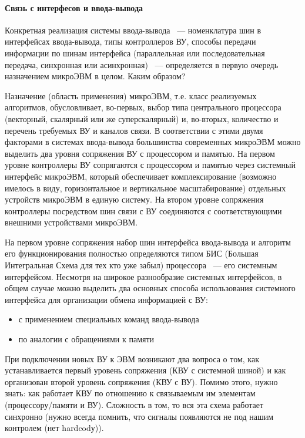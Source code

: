 \documentclass[10pt]{article}
\begin{document}
	\paragraph{Связь с интерфесов и ввода-вывода}
	Конкретная реализация системы ввода-вывода ~--- номенклатура шин в интерфейсах ввода-вывода, типы контроллеров ВУ, способы передачи информации по шинам интерфейса (параллельная или последовательная передача, синхронная или асинхронная) ~--- определяется в первую очередь назначением микроЭВМ в целом. Каким образом?

	Назначение (область применения) микроЭВМ, т.е. класс реализуемых алгоритмов, обусловливает, во-первых, выбор типа центрального процессора (векторный, скалярный или же суперскалярный) и, во-вторых, количество и перечень требуемых ВУ и каналов связи. В соответствии с этими двумя факторами в системах ввода-вывода большинства современных микроЭВМ можно выделить два уровня сопряжения ВУ с процессором и памятью. На первом уровне контроллеры ВУ сопрягаются с процессором и памятью через системный интерфейс микроЭВМ, который обеспечивает комплексирование (возможно имелось в виду, горизонтальное и вертикальное масштабирование) отдельных устройств микроЭВМ в единую систему. На втором уровне сопряжения контроллеры посредством шин связи с ВУ соединяются с соответствующими внешними устройствами микроЭВМ.
	\begin{center}
	\end{center}

	На первом уровне сопряжения набор шин интерфейса ввода-вывода и алгоритм его функционирования полностью определяются типом БИС (Большая Интегральная Схема для тех кто уже забыл) процессора ~--- его системным интерфейсом. Несмотря на широкое разнообразие системных интерфейсов, в общем случае можно выделить два основных способа использования системного интерфейса для организации обмена информацией с ВУ:
	\begin{itemize}
		\item с применением специальных команд ввода-вывода
		\item по аналогии с обращениями к памяти
	\end{itemize}
	При подключении новых ВУ к ЭВМ возникают два вопроса о том, как устанавливается первый уровень сопряжения (КВУ с системной шиной) и как организован второй уровень сопряжения (КВУ с ВУ). Помимо этого, нужно знать: как работает КВУ по отношению к связываемым им элементам (процессору/памяти и ВУ). Сложность в том, то вся эта схема работает синхронно (нужно всегда помнить, что сигналы появляются не под нашим контролем (нет hardcodу)).
\end{document}
